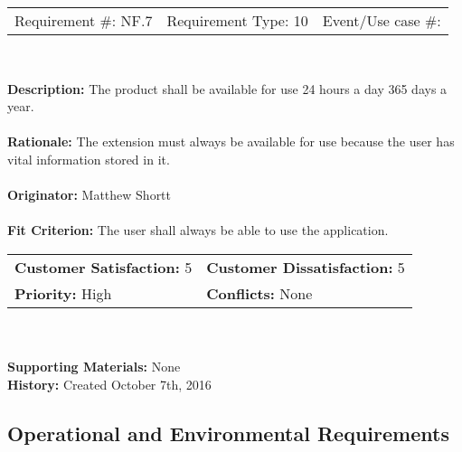 \documentclass[12pt, titlepage]{article}
\begin{document}
\begin{framed}
	
	\begin{center}
		
		\begin{tabular}{ l c r }
			Requirement \#: NF.7 & Requirement Type: 10 & Event/Use case \#: \\
		\end{tabular} \\
	\end{center}
	\textbf{Description:} The product shall be available for use 24 hours a day 365 days a 
	year.\\
	\\
	\textbf{Rationale:} The extension must always be available for use because the user has 
	vital 
	information stored in it.  \\
	\\
	\textbf{Originator:} Matthew Shortt \\
	\\
	\textbf{Fit Criterion:} The user shall always be able to use the application.  
	\\
	
	\begin{tabular}{ll}
		\textbf{Customer Satisfaction:} 5 & \textbf{Customer Dissatisfaction:} 5 \\
		\textbf{Priority:} High & \textbf{Conflicts:} None\\
	\end{tabular} \\
	\\
	\textbf{Supporting Materials:} None \\
	\textbf{History:} Created October 7th, 2016
	
\end{framed}


\subsection{Operational and Environmental Requirements}
\end{document}
